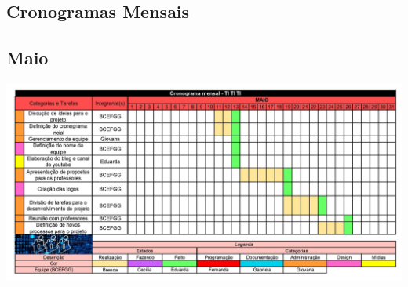 \begin{apendicesenv}

\partapendices









\chapter{Cronogramas Mensais}
\section{Maio}
\centering
\includegraphics[scale=0.7,angle=90,pagecommand=\chapter{Cronograma Mensal - Maio}\label{cronograma-maio}]{imagens/CronogramaMAIO.jpg}


\end{apendicesenv}
